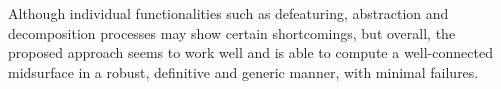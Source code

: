 % 
%
%


Although individual functionalities such as defeaturing, abstraction and decomposition processes may show certain shortcomings, but overall, the proposed approach seems to work well and is able to compute a well-connected midsurface in a robust, definitive and generic manner, with minimal failures.  




